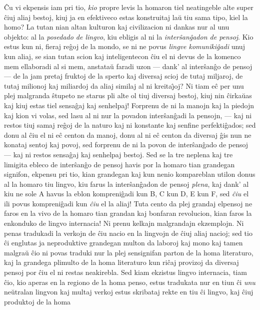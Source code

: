    \^Cu vi ekpensis iam pri tio, {\sl kio} propre levis la homaron tiel
neatingeble alte super \^ciuj aliaj bestoj, kiuj ja en efektiveco
estas konstruitaj la\u u tiu sama tipo, kiel la homo? La tutan nian
altan kulturon kaj civilizacion ni dankas nur al unu objekto: al la
{\sl posedado de lingvo}, kiu ebligis al ni la {\sl
inter\^san\^gadon de pensoj}. Kio estus kun ni, fieraj re\^goj de la
mondo, se ni ne povus {\sl lingve komuniki\^gadi} unuj kun aliaj, se
sian tutan scion kaj inteligentecon \^ciu el ni devus de la komenco
mem ellaboradi al si mem, anstata\u u faradi uzon --- dank' al
inter\^san\^go de pensoj --- de la jam pretaj fruktoj de la sperto
kaj diversaj scioj de tutaj miljaroj, de tutaj milionoj kaj
miliardoj da aliaj similaj al ni kreita\^{\j}oj? Ni tiam e\^c per
unu plej malgranda \^stupeto ne starus pli alte ol tiuj diversaj
bestoj, kiuj nin \^cirka\u uas kaj kiuj estas tiel sensa\^gaj kaj
senhelpaj! Forprenu de ni la manojn kaj la piedojn kaj kion vi
volas, sed lasu al ni nur la povadon inter\^san\^gadi la pensojn,
--- kaj ni restos tiuj samaj re\^goj de la naturo kaj ni konstante
kaj senfine perfekti\^gados; sed donu al \^ciu el ni e\^c centon da
manoj, donu al ni e\^c centon da diversaj \^gis nun ne konataj
sentoj kaj povoj, sed forprenu de ni la povon de inter\^san\^gado de
pensoj --- kaj ni restos sensa\^gaj kaj senhelpaj bestoj. Sed se la
tre neplena kaj tre limigita ebleco de inter\^san\^go de pensoj
havis por la homaro tian grandegan signifon, ekpensu pri tio, kian
grandegan kaj kun nenio kompareblan utilon donus al la homaro tiu
lingvo, kiu farus la inter\^san\^gadon de pensoj {\sl plena}, kaj
dank' al kiu ne sole A havus la eblon kompreni\^gadi kun B, C kun D,
E kun F, sed {\sl \^ciu} el ili povus kompreni\^gadi kun {\sl \^ciu}
el la aliaj! Tuta cento da plej grandaj elpensoj ne faros en la vivo
de la homaro tian grandan kaj bonfaran revolucion, kian faros la
enkonduko de lingvo internacia! Ni prenu kelkajn malgrandajn
ekzemplojn. Ni penas tradukadi la verkojn de \^ciu nacio en la
lingvojn de \^ciuj aliaj nacioj; sed tio \^ci englutas ja
neproduktive grandegan multon da laboroj kaj mono kaj tamen malgra\u
u \^cio ni povas traduki nur la plej sensignifan parton de la homa
literaturo, kaj la grandega plimulto de la homa literaturo kun
ri\^caj provizoj da diversaj pensoj por \^ciu el ni restas
neakirebla. Sed kiam ekzistus lingvo internacia, tiam \^cio, kio
aperas en la regiono de la homa penso, estus tradukata nur en tiun
\^ci {\sl unu} ne\u utralan lingvon kaj multaj verkoj estus
skribataj rekte en tiu \^ci lingvo, kaj \^ciuj produktoj de la homa
